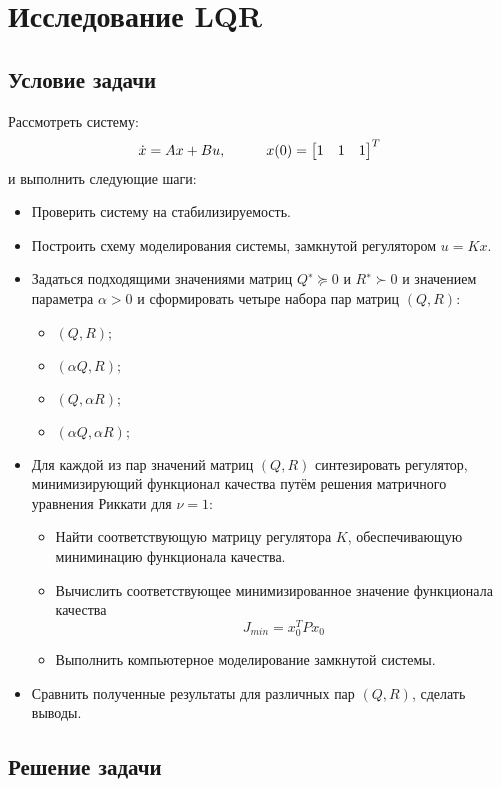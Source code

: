 \chapter{Исследование LQR}
\label{ch:chap1}
\section{Условие задачи}

Рассмотреть систему:
$$
  \dot{x} = Ax + Bu, \hspace*{1cm} x(0) = \begin{bmatrix} 1 & 1 & 1\end{bmatrix}^T
$$ и выполнить следующие шаги:

\begin{itemize}
\item Проверить систему на стабилизируемость.
\item Построить схему моделирования системы, замкнутой регулятором $u = Kx$.
\item Задаться подходящими значениями матриц $Q^∗ \succeq 0$ и $R^∗ \succ 0$ и 
значением параметра $\alpha > 0$ и сформировать четыре набора пар матриц $(Q,R)$:
\begin{itemize}
  \item $(Q,R);$
  \item $(\alpha Q,R);$
  \item $(Q, \alpha R);$
  \item $( \alpha Q, \alpha R);$
\end{itemize}
\item Для каждой из пар значений матриц $(Q,R)$ синтезировать регулятор, 
минимизирующий функционал качества путём решения матричного уравнения Риккати для $\nu = 1$:
\begin{itemize}
  \item  Найти соответствующую матрицу регулятора $K$, обеспечивающую миниминацию 
  функционала качества.
  \item Вычислить соответствующее минимизированное значение функционала качества 
  $$J_{min} = x_0^T P x_0$$
  \item Выполнить компьютерное моделирование замкнутой системы.
\end{itemize}
\item Сравнить полученные результаты для различных пар $(Q,R)$, сделать выводы.

\end{itemize}

\newpage
\section{Решение задачи}

